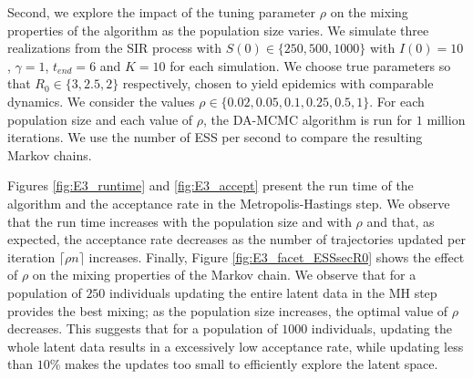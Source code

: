 \documentclass[11pt]{article}
\begin{document}
	Second, we explore the impact of the tuning parameter $\rho$ on the mixing properties of the algorithm as the population size varies.
	We simulate three realizations from the SIR process with $S(0) \in \{250, 500, 1000\}$ with  $I(0)=10$, $\gamma=1$, $t_{end} = 6$ and $K = 10$ for each simulation. We choose true parameters so that $R_0 \in \{3, 2.5, 2\}$ respectively, chosen to yield epidemics with comparable dynamics. We consider the values $\rho \in \{0.02, 0.05, 0.1, 0.25, 0.5, 1\}$. For each population size and each value of $\rho$, the DA-MCMC algorithm is run for $1$ million iterations. We use the number of ESS per second to compare the resulting Markov chains.
	
	Figures \ref{fig:E3_runtime} and \ref{fig:E3_accept} present the run time of the algorithm and the acceptance rate in the Metropolis-Hastings step. We observe that the run time increases with the population size and with $\rho$ and that, as expected, the acceptance rate decreases as the number of trajectories updated per iteration $\lceil\rho n\rceil$ increases.
	Finally, Figure \ref{fig:E3_facet_ESSsecR0} shows the effect of $\rho$ on the mixing properties of the Markov chain. We observe that for a population of $250$ individuals updating the entire latent data in the MH step provides the best mixing; as the population size increases, the optimal value of $\rho$ decreases. This suggests that for a population of $1000$ individuals, updating the whole latent data results in a excessively low acceptance rate, while updating less than $10$\% makes the updates too small to efficiently explore the latent space.
	
\end{document}
